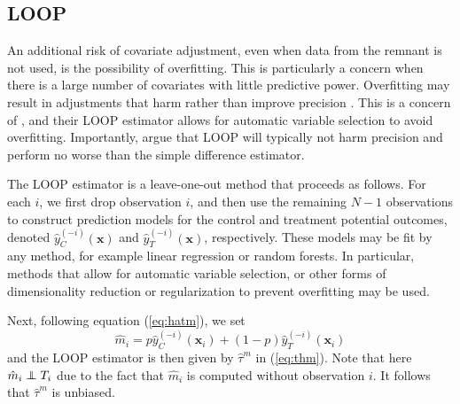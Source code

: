 \subsection{LOOP}

An additional risk of covariate adjustment, even when data from the remnant is not used, is the possibility of overfitting.  This is particularly a concern when there is a large number of covariates with little predictive power.  Overfitting may result in adjustments that harm rather than improve precision \citep{freedman2008regression, miratrix}.  This is a concern of \cite{loop}, and their LOOP estimator allows for automatic variable selection to avoid overfitting.  Importantly, \cite{loop} argue that LOOP will typically not harm precision and perform no worse than the simple difference estimator.

The LOOP estimator is a leave-one-out method that proceeds as follows.  For each $i$, we first drop observation $i$, and then use the remaining $N-1$ observations to construct prediction models for the control and treatment potential outcomes, denoted $\hat{y}^{(-i)}_C(\mathbf{x})$ and $\hat{y}^{(-i)}_T(\mathbf{x})$, respectively.  These models may be fit by any method, for example linear regression or random forests.  In particular, methods that allow for automatic variable selection, or other forms of dimensionality reduction or regularization to prevent overfitting may be used.

Next, following equation (\ref{eq:hatm}), we set
\begin{equation}
\hat{m}_i = p\hat{y}^{(-i)}_{C}(\mathbf{x}_i) + (1-p)\hat{y}^{(-i)}_{T}(\mathbf{x}_i)
\end{equation}
and the LOOP estimator is then given by $\hat{\tau}^m$ in (\ref{eq:thm}).  Note that here $\hat{m}_i \independent T_i$ due to the fact that $\hat{m}_i$ is computed without observation $i$.  It follows that $\hat{\tau}^m$ is unbiased.

